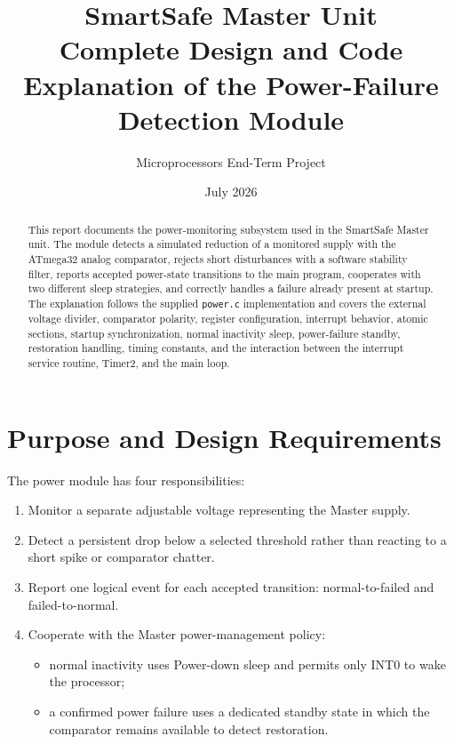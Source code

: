 \documentclass[11pt,a4paper]{article}
\title{\textbf{SmartSafe Master Unit}\\[4pt]
\Large Complete Design and Code Explanation of the Power-Failure Detection Module}
\author{Microprocessors End-Term Project}
\date{July 2026}
\begin{document}
\maketitle
\thispagestyle{empty}

\begin{abstract}
This report documents the power-monitoring subsystem used in the SmartSafe Master unit. The module detects a simulated reduction of a monitored supply with the ATmega32 analog comparator, rejects short disturbances with a software stability filter, reports accepted power-state transitions to the main program, cooperates with two different sleep strategies, and correctly handles a failure already present at startup. The explanation follows the supplied \texttt{power.c} implementation and covers the external voltage divider, comparator polarity, register configuration, interrupt behavior, atomic sections, startup synchronization, normal inactivity sleep, power-failure standby, restoration handling, timing constants, and the interaction between the interrupt service routine, Timer2, and the main loop.
\end{abstract}

\tableofcontents
\newpage

\section{Purpose and Design Requirements}
The power module has four responsibilities:
\begin{enumerate}[label=\arabic*.]
  \item Monitor a separate adjustable voltage representing the Master supply.
  \item Detect a persistent drop below a selected threshold rather than reacting to a short spike or comparator chatter.
  \item Report one logical event for each accepted transition: normal-to-failed and failed-to-normal.
  \item Cooperate with the Master power-management policy:
  \begin{itemize}
    \item normal inactivity uses Power-down sleep and permits only INT0 to wake the processor;
    \item a confirmed power failure uses a dedicated standby state in which the comparator remains available to detect restoration.
  \end{itemize}
\end{enumerate}
\end{document}
